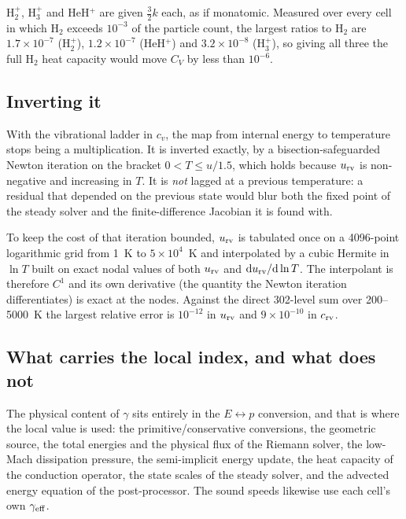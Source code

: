 \documentclass[english,a4paper]{my_memo}
\begin{document}
H$_2^+$, H$_3^+$ and HeH$^+$ are given $\tfrac{3}{2} k$ each, as if monatomic.
Measured over every cell in which H$_2$ exceeds $10^{-3}$ of the particle
count, the largest ratios to H$_2$ are $1.7\times10^{-7}$ (H$_2^+$),
$1.2\times10^{-7}$ (HeH$^+$) and $3.2\times10^{-8}$ (H$_3^+$), so giving all
three the full H$_2$ heat capacity would move $C_V$ by less than $10^{-6}$.

\subsection{Inverting it}

With the vibrational ladder in $c_v$, the map from internal energy to
temperature stops being a multiplication. It is inverted exactly, by a
bisection-safeguarded Newton iteration on the bracket $0 < T \le u/1.5$, which
holds because $u_{\rm rv}$ is non-negative and increasing in $T$. It is
\emph{not} lagged at a previous temperature: a residual that depended on the
previous state would blur both the fixed point of the steady solver and the
finite-difference Jacobian it is found with.

To keep the cost of that iteration bounded, $u_{\rm rv}$ is tabulated once on a
4096-point logarithmic grid from 1~K to $5\times10^{4}$~K and interpolated by a
cubic Hermite in $\ln T$ built on exact nodal values of both $u_{\rm rv}$ and
${\rm d}u_{\rm rv}/{\rm d}\ln T$. The interpolant is therefore $C^1$ and its own
derivative (the quantity the Newton iteration differentiates) is exact at
the nodes. Against the direct 302-level sum over 200--5000~K the largest
relative error is $10^{-12}$ in $u_{\rm rv}$ and $9\times10^{-10}$ in
$c_{\rm rv}$.

\subsection{What carries the local index, and what does not}

The physical content of $\gamma$ sits entirely in the $E \leftrightarrow p$
conversion, and that is where the local value is used: the primitive/conservative
conversions, the geometric source, the total energies and the physical flux of
the Riemann solver, the low-Mach dissipation pressure, the semi-implicit energy
update, the heat capacity of the conduction operator, the state scales of the
steady solver, and the advected energy equation of the post-processor. The sound
speeds likewise use each cell's own $\gamma_{\rm eff}$.
\end{document}
